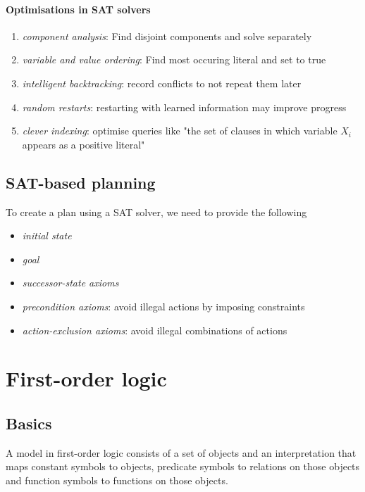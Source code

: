 \documentclass{article}
\begin{document}
\paragraph{Optimisations in SAT solvers}
\begin{enumerate}
    \item \emph{component analysis}: Find disjoint components and solve separately
    \item \emph{variable and value ordering}: Find most occuring literal and set to true
    \item \emph{intelligent backtracking}: record conflicts to not repeat them later
    \item \emph{random restarts}: restarting with learned information may improve progress
    \item \emph{clever indexing}: optimise queries like "the set of clauses in which variable $X_i$ appears as a positive literal"
\end{enumerate}

\subsection{SAT-based planning}

\begin{theorem}
    To create a plan using a SAT solver, we need to provide the following
    \begin{itemize}
        \item \emph{initial state}
        \item \emph{goal}
        \item \emph{successor-state axioms}
        \item \emph{precondition axioms}: avoid illegal actions by imposing constraints
        \item \emph{action-exclusion axioms}: avoid illegal combinations of actions
    \end{itemize}
\end{theorem}


\section{First-order logic}


\subsection{Basics}

\begin{definition}
    A model in first-order logic consists of a set of objects and an interpretation
    that maps constant symbols to objects, predicate symbols to relations on
    those objects and function symbols to functions on those objects.
\end{definition}
\end{document}
